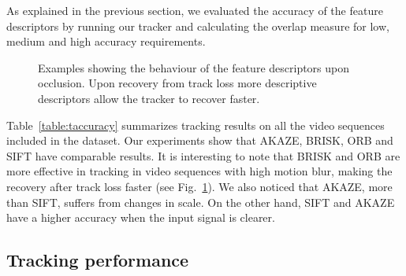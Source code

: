 As explained in the previous section, we evaluated the accuracy of the feature descriptors by running our tracker and calculating the overlap measure for low, medium and high accuracy requirements. 
\begin{figure}[!h]
	\vspace{2mm}
\centerline{%
	}
\caption{Examples showing the behaviour of the feature descriptors upon occlusion. Upon recovery from track loss more descriptive descriptors allow the tracker to recover faster.}
\vspace{-3mm}
\label{fig:tracking_results}
\end{figure}

Table~\ref{table:taccuracy} summarizes tracking results on all the video sequences included in the dataset.  Our experiments show that AKAZE, BRISK, ORB and SIFT have comparable results. It is interesting to note that BRISK and ORB are more effective in tracking in video sequences with high motion blur, making the recovery after track loss faster (see Fig.~\ref{fig:tracking_results}). We also noticed that AKAZE, more than SIFT, suffers from changes in scale. On the other hand, SIFT and AKAZE have a higher accuracy when the input signal is clearer.

\subsection{Tracking performance}

